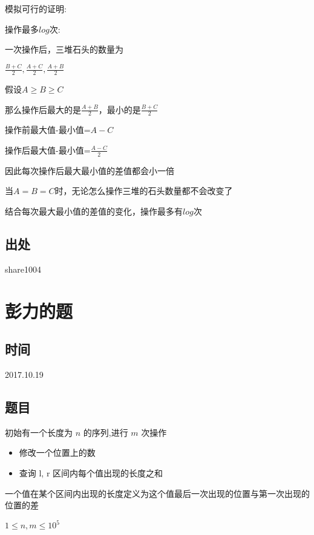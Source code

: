 \documentclass[a4paper]{article}
\begin{document}
		模拟可行的证明:
		
		操作最多$log$次:
		
		一次操作后，三堆石头的数量为
		
		$\frac{B+C}{2},\frac{A+C}{2},\frac{A+B}{2}$
		
		假设$A \geq B \geq C $
		
		那么操作后最大的是$\frac{A+B}{2}$，最小的是$\frac{B+C}{2}$
		
		操作前最大值-最小值=$A - C$
		
		操作后最大值-最小值=$\frac{A-C}{2}$
		
		因此每次操作后最大最小值的差值都会小一倍
		
		当$A = B = C$时，无论怎么操作三堆的石头数量都不会改变了
		
		结合每次最大最小值的差值的变化，操作最多有$log$次
		
	\subsection{出处}
		
		share1004
	
	\newpage
	
	\section{彭力的题}
		
	\subsection{时间}
		
		2017.10.19
		
	\subsection{题目}
		
		初始有一个长度为 $n$ 的序列,进行 $m$ 次操作

		\begin{itemize}
				
		\item 修改一个位置上的数

		\item 查询 l, r 区间内每个值出现的长度之和
		
		\end{itemize}
		
		一个值在某个区间内出现的长度定义为这个值最后一次出现的位置与第一次出现的位置的差
		
		$1 \leq n,m \leq 10^ 5$
		
\end{document}
